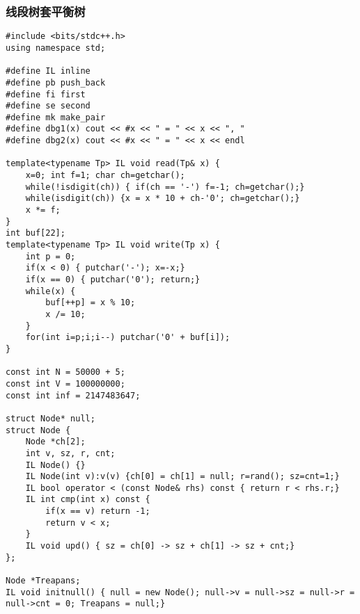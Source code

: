 \documentclass[UTF8]{ctexart}
\begin{document}
\subsubsection{线段树套平衡树}

\begin{framed}
\begin{lstlisting}
#include <bits/stdc++.h>
using namespace std;

#define IL inline
#define pb push_back
#define fi first
#define se second
#define mk make_pair
#define dbg1(x) cout << #x << " = " << x << ", "
#define dbg2(x) cout << #x << " = " << x << endl

template<typename Tp> IL void read(Tp& x) {
    x=0; int f=1; char ch=getchar();
    while(!isdigit(ch)) { if(ch == '-') f=-1; ch=getchar();}
    while(isdigit(ch)) {x = x * 10 + ch-'0'; ch=getchar();}
    x *= f;
}
int buf[22];
template<typename Tp> IL void write(Tp x) {
    int p = 0;
    if(x < 0) { putchar('-'); x=-x;}
    if(x == 0) { putchar('0'); return;}
    while(x) {
        buf[++p] = x % 10;
        x /= 10;
    }
    for(int i=p;i;i--) putchar('0' + buf[i]);
}

const int N = 50000 + 5;
const int V = 100000000;
const int inf = 2147483647;

struct Node* null;
struct Node {
    Node *ch[2];
    int v, sz, r, cnt;
    IL Node() {}
    IL Node(int v):v(v) {ch[0] = ch[1] = null; r=rand(); sz=cnt=1;}
    IL bool operator < (const Node& rhs) const { return r < rhs.r;}
    IL int cmp(int x) const {
        if(x == v) return -1;
        return v < x;
    }
    IL void upd() { sz = ch[0] -> sz + ch[1] -> sz + cnt;}
};

Node *Treapans;
IL void initnull() { null = new Node(); null->v = null->sz = null->r = null->cnt = 0; Treapans = null;}




\end{lstlisting}
\end{framed}
\end{document}
